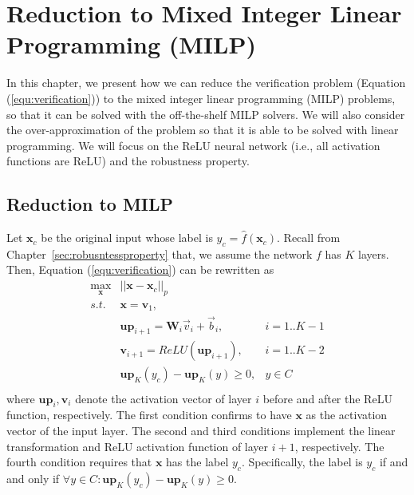 \section{Reduction to Mixed Integer Linear Programming (MILP)}\label{chap:MILP}

In this chapter, we present how we can reduce the verification problem (Equation (\ref{equ:verification})) to the mixed integer linear programming (MILP) problems, so that it can be solved with the off-the-shelf MILP solvers. We will also consider the over-approximation of the problem so that it is able to be solved with linear programming. We will focus on the ReLU neural network (i.e., all activation functions are ReLU) and the robustness property.

\subsection{Reduction to MILP}

Let $\textbf{x}_c$ be the original input whose label is $y_c=\hat{f}(\textbf{x}_c)$. Recall from Chapter~\ref{sec:robusntessproperty} that, we assume the network $f$ has $K$ layers. Then, Equation (\ref{equ:verification}) can be rewritten as 
\begin{equation}\label{equ:robustnessreduction}
\begin{array}{rll}
  \displaystyle\max_{\textbf{x}}  &   ||\textbf{x} - \textbf{x}_c||_p & \\
    s.t. &  \textbf{x} = \textbf{v}_1, & \\
    & \textbf{up}_{i+1} =  \textbf{W}_i \vec{v}_{i} + \vec{b}_i, & i = 1..K-1\\
    & \textbf{v}_{i+1} = ReLU(\textbf{up}_{i+1}),  & i = 1..K-2 \\
    &  \textbf{up}_{K}(y_c) - \textbf{up}_{K}(y)\geq 0,  & y\in C \\
\end{array}
\end{equation}
where $\textbf{up}_{i},\textbf{v}_{i}$ denote the activation vector of layer $i$ before and after the ReLU function, respectively. 
The first condition confirms to have $\textbf{x}$ as the activation vector of the input layer. 
The second and third conditions implement the linear transformation and ReLU activation function of layer $i+1$, respectively. The fourth condition requires that $\textbf{x}$ has the label $y_c$.  Specifically, the label is $y_c$ if and and only if $\forall {y\in C}:  \textbf{up}_{K}(y_c) - \textbf{up}_{K}(y)\geq 0$. 


